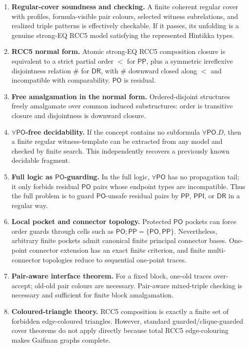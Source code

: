 \documentclass[11pt]{article}
\newcommand{\PP}{\mathsf{PP}}
\newcommand{\PPI}{\mathsf{PPI}}
\newcommand{\PO}{\mathsf{PO}}
\newcommand{\DR}{\mathsf{DR}}
\begin{document}
\begin{enumerate}
\item \textbf{Regular-cover soundness and checking.} A finite coherent regular cover with profiles, formula-visible pair colours, selected witness subrelations, and realized triple patterns is effectively checkable.  If it passes, its unfolding is a genuine strong-EQ RCC5 model satisfying the represented Hintikka types.

\item \textbf{RCC5 normal form.} Atomic strong-EQ RCC5 composition closure is equivalent to a strict partial order $<$ for $\PP$, plus a symmetric irreflexive disjointness relation $\#$ for $\DR$, with $\#$ downward closed along $<$ and incompatible with comparability.  $\PO$ is residual.

\item \textbf{Free amalgamation in the normal form.} Ordered-disjoint structures freely amalgamate over common induced substructures: order is transitive closure and disjointness is downward closure.

\item \textbf{$\forall\PO$-free decidability.} If the concept contains no subformula $\forall\PO.D$, then a finite regular witness-template can be extracted from any model and checked by finite search.  This independently recovers a previously known decidable fragment.

\item \textbf{Full logic as $\PO$-guarding.} In the full logic, $\forall\PO$ has no propagation tail; it only forbids residual $\PO$ pairs whose endpoint types are incompatible.  Thus the full problem is to guard $\PO$-unsafe residual pairs by $\PP$, $\PPI$, or $\DR$ in a regular way.

\item \textbf{Local pocket and connector topology.} Protected $\PO$ pockets can force order guards through cells such as $\PO;\PP=\{\PO,\PP\}$.  Nevertheless, arbitrary finite pockets admit canonical finite principal connector bases.  One-point connector extension has an exact finite criterion, and finite multi-connector topologies reduce to sequential one-point traces.

\item \textbf{Pair-aware interface theorem.} For a fixed block, one-old traces over-accept; old-old pair colours are necessary.  Pair-aware mixed-triple checking is necessary and sufficient for finite block amalgamation.

\item \textbf{Coloured-triangle theory.} RCC5 composition is exactly a finite set of forbidden edge-coloured triangles.  However, standard guarded/clique-guarded cover theorems do not apply directly because total RCC5 edge-colouring makes Gaifman graphs complete.
\end{enumerate}
\end{document}
